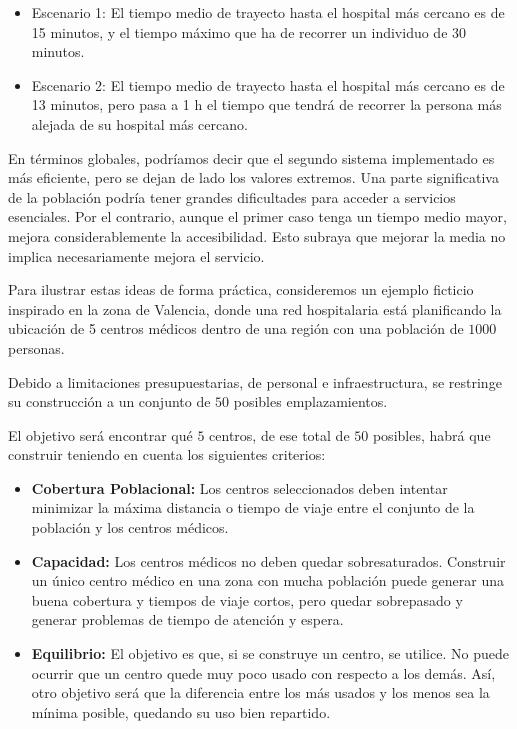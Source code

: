 \documentclass[12pt,a4paper]{book}
\begin{document}
\begin{itemize}
    \item Escenario 1: El tiempo medio de trayecto hasta el hospital más cercano es de 15 minutos, y el tiempo máximo que ha de recorrer un individuo de 30 minutos.
    \item Escenario 2: El tiempo medio de trayecto hasta el hospital más cercano es de 13 minutos, pero pasa a 1 h el tiempo que tendrá de recorrer la persona más alejada de su hospital más cercano.
\end{itemize} 

En términos globales, podríamos decir que el segundo sistema implementado es más eficiente, pero se dejan de lado los valores extremos.
Una parte significativa de la población podría tener grandes dificultades para acceder a servicios esenciales.
Por el contrario, aunque el primer caso tenga un tiempo medio mayor, mejora considerablemente la accesibilidad. Esto subraya que mejorar la media no implica necesariamente mejora el servicio.
\newpage

Para ilustrar estas ideas de forma práctica, consideremos un ejemplo ficticio inspirado en la zona de Valencia, donde una red hospitalaria está
planificando la ubicación de 5 centros médicos dentro de una región con una población de $1000$ personas. 

Debido a limitaciones presupuestarias, de personal e infraestructura, se restringe su construcción a un conjunto de $50$ posibles emplazamientos. 

El objetivo será encontrar qué $5$ centros, de ese total de $50$ posibles, habrá que construir teniendo en cuenta los siguientes criterios:

\begin{itemize}
    \item \textbf{Cobertura Poblacional:} Los centros seleccionados deben intentar minimizar la máxima distancia o tiempo de viaje entre el conjunto de la población y los centros médicos.
    \item \textbf{Capacidad:} Los centros médicos no deben quedar sobresaturados. Construir un único centro médico en una zona con mucha población puede generar una buena cobertura y tiempos de viaje cortos, pero quedar sobrepasado y generar problemas de tiempo de atención y espera.
    \item \textbf{Equilibrio:} El objetivo es que, si se construye un centro, se utilice. No puede ocurrir que un centro quede muy poco usado con respecto a los demás. Así, otro objetivo será que la diferencia entre los más usados y los menos sea la mínima posible, quedando su uso bien repartido.
\end{itemize}
\end{document}
